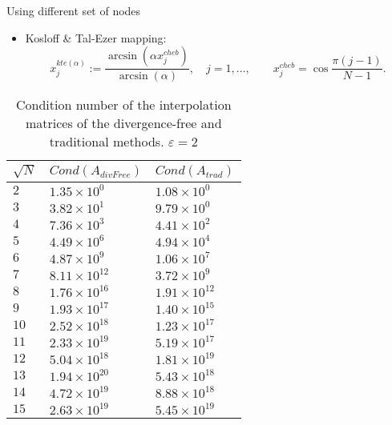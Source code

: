 \documentclass{beamer}
\begin{document}
\begin{frame}{Using different set of nodes}
  \begin{itemize}
    \item Kosloff & Tal-Ezer mapping:
      \begin{equation*}
        x_j^{kte(\alpha)} := \frac{\arcsin(\alpha x_j^{cheb})}{\arcsin(\alpha)},
	\quad j = 1,\ldots, \qquad x_j^{cheb} = \cos{\frac{\pi(j-1)}{N-1}}.
      \end{equation*}
  \end{itemize}

  \begin{table}[hptb]
    \begin{center}
      \begin{tabular}{l||l|l}
        \multicolumn{1}{c||}{$\sqrt{N}$} & 
	\multicolumn{1}{c}{$Cond(A_{divFree})$} & 
	\multicolumn{1}{c}{$Cond(A_{trad})$} \\
        \hline \hline
        $2$ & $1.35\times 10^{0}$ & $1.08\times 10^{0}$ \\
        $3$ & $3.82\times 10^{1}$ & $9.79\times 10^{0}$ \\
        $4$ & $7.36\times 10^{3}$ & $4.41\times 10^{2}$ \\
        $5$ & $4.49\times 10^{6}$ & $4.94\times 10^{4}$ \\
        $6$ & $4.87\times 10^{9}$ & $1.06\times 10^{7}$ \\
        $7$ & $8.11\times 10^{12}$ & $3.72\times 10^{9}$ \\
        $8$ & $1.76\times 10^{16}$ & $1.91\times 10^{12}$ \\
        $9$ & $1.93\times 10^{17}$ & $1.40\times 10^{15}$ \\
        $10$ & $2.52\times 10^{18}$ & $1.23\times 10^{17}$ \\
        $11$ & $2.33\times 10^{19}$ & $5.19\times 10^{17}$ \\
        $12$ & $5.04\times 10^{18}$ & $1.81\times 10^{19}$ \\
        $13$ & $1.94\times 10^{20}$ & $5.43\times 10^{18}$ \\
        $14$ & $4.72\times 10^{19}$ & $8.88\times 10^{18}$ \\
        $15$ & $2.63\times 10^{19}$ & $5.45\times 10^{19}$   
    \end{tabular}
    \end{center}
    \caption{Condition number of the interpolation matrices of the 
    divergence-free and traditional methods. $\varepsilon = 2$}
  \end{table}
\end{frame}
\end{document}
